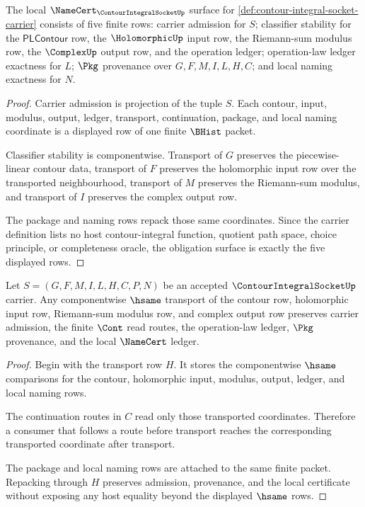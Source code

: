 \begin{theorem}
\label{thm:contour-integral-socket-namecert-obligations}
The local $\NameCert_{\ContourIntegralSocketUp}$ surface for \autoref{def:contour-integral-socket-carrier} consists of five finite rows: carrier admission for $S$; classifier stability for the $\mathsf{PLContour}$ row, the $\HolomorphicUp$ input row, the Riemann-sum modulus row, the $\ComplexUp$ output row, and the operation ledger; operation-law ledger exactness for $L$; $\Pkg$ provenance over $G,F,M,I,L,H,C$; and local naming exactness for $N$.
\end{theorem}
\begin{proof}
Carrier admission is projection of the tuple $S$. Each contour, input, modulus, output, ledger, transport, continuation, package, and local naming coordinate is a displayed row of one finite $\BHist$ packet.

Classifier stability is componentwise. Transport of $G$ preserves the piecewise-linear contour data, transport of $F$ preserves the holomorphic input row over the transported neighbourhood, transport of $M$ preserves the Riemann-sum modulus, and transport of $I$ preserves the complex output row.

The package and naming rows repack those same coordinates. Since the carrier definition lists no host contour-integral function, quotient path space, choice principle, or completeness oracle, the obligation surface is exactly the five displayed rows.
\end{proof}

\begin{theorem}
\label{thm:contour-integral-socket-transport}
Let $S=(G,F,M,I,L,H,C,P,N)$ be an accepted $\ContourIntegralSocketUp$ carrier. Any componentwise $\hsame$ transport of the contour row, holomorphic input row, Riemann-sum modulus row, and complex output row preserves carrier admission, the finite $\Cont$ read routes, the operation-law ledger, $\Pkg$ provenance, and the local $\NameCert$ ledger.
\end{theorem}
\begin{proof}
Begin with the transport row $H$. It stores the componentwise $\hsame$ comparisons for the contour, holomorphic input, modulus, output, ledger, and local naming rows.

The continuation routes in $C$ read only those transported coordinates. Therefore a consumer that follows a route before transport reaches the corresponding transported coordinate after transport.

The package and local naming rows are attached to the same finite packet. Repacking through $H$ preserves admission, provenance, and the local certificate without exposing any host equality beyond the displayed $\hsame$ rows.
\end{proof}

